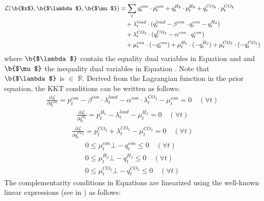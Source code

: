 \documentclass[review]{elsarticle}
\begin{document}
\begin{align}
	\begin{split}
		\mathcal{L}(\b{$x$}, \b{$\lambda$}, \b{$\mu$}) &=\sum_{t} q_{t}^{con} \cdot p_{t}^{con} + q_{t}^{H_2} \cdot p_{t}^{H_2} + q_{t}^{CO_2} \cdot p_{t}^{CO_2}\label{equ_follower_Lagrangian}\\
		& \quad + \lambda_{t}^{load} \cdot (q_{t}^{load} - \beta^{con} \cdot q_{t}^{con} - q_{t}^{H_2})\\
		& \quad + \lambda_{t}^{CO_2} \cdot (q_{t}^{CO_2} - \alpha^{con}\cdot q_{t}^{con})\\
		& \quad + \mu_t^{con} \cdot (-q_{t}^{con}) + \mu_t^{H_2} \cdot (-q_{t}^{H_2}) + \mu_t^{CO_2} \cdot (-q_{t}^{CO_2})
	\end{split}
\end{align}
where $\b{$\lambda$}$ contain the equality dual variables in Equation  and  and $\b{$\mu$}$ the inequality dual variables in Equation . Note that $\b{$\lambda$}$ is $\in$ $\mathbb{R}$. Derived from the Lagrangian function in the prior equation, the KKT conditions can be written as follows:
\begin{align}\label{h1}
	\frac{\partial \mathcal{L}}{\partial q_{t}^{con}} = p_{t}^{con} - \beta^{con} \cdot \lambda_t^{load} - \alpha^{con}\cdot \lambda_{t}^{CO_2}-\mu_t^{con} = 0 \quad (\forall t)
\end{align}
\begin{align}\label{h2}
	\frac{\partial \mathcal{L}}{\partial q_{t}^{H_2}} = p_{t}^{H_2} - \lambda_t^{load} -\mu_t^{H_2} = 0 \quad (\forall t)
\end{align}
\begin{align}\label{h3}
	\frac{\partial \mathcal{L}}{\partial q_{t}^{CO_2}} = p_{t}^{CO_2} + \lambda_t^{CO_2} -\mu_t^{CO_2} = 0 \quad (\forall t)
\end{align}
\begin{align}
	0 \leq \mu_t^{con} \bot -q_{t}^{con} \leq 0 \quad (\forall t) \label{CC1}\\
	0 \leq \mu_t^{H_2} \bot -q_{t}^{H_2} \leq 0 \quad (\forall t) \label{CC2}\\
	0 \leq \mu_t^{CO_2} \bot -q_{t}^{CO_2} \leq 0 \quad (\forall t) \label{CC3}
\end{align}
The complementarity conditions in Equations  are linearized using the well-known linear expressions (see in \cite{ruiz2009pool}) as follows:
\end{document}
